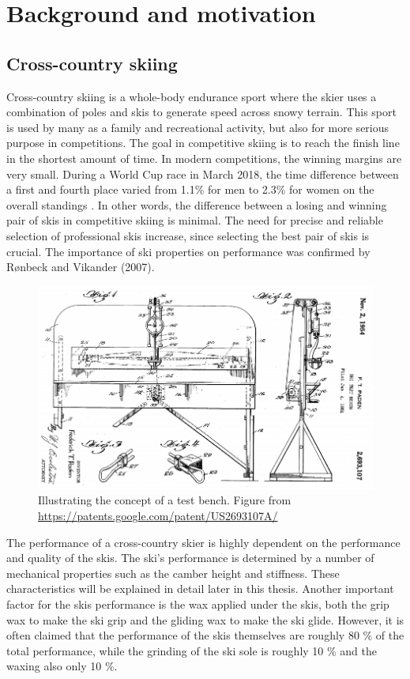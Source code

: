 \chapter{Background and motivation}
\section{Cross-country skiing}
Cross-country skiing is a whole-body endurance sport where the skier uses a combination of poles and skis to generate speed across snowy terrain. This sport is used by many as a family and recreational activity, but also for more serious purpose in competitions. The goal in competitive skiing is to reach the finish line in the shortest amount of time. In modern competitions, the winning margins are very small. During a World Cup race in March 2018, the time difference between a first and fourth place varied from 1.1\% for men to 2.3\% for women on the overall standings \citep{fis_2018}. In other words, the difference between a losing and winning pair of skis in competitive skiing is minimal. The need for precise and reliable selection of professional skis increase, since selecting the best pair of skis is crucial. The importance of ski properties on performance was confirmed by Rønbeck and Vikander (2007).

\begin{figure}
    \centering
    \includegraphics[width=1\textwidth]{figures/earlytb.png}
    \caption{Illustrating the concept of a test bench. Figure from \url{https://patents.google.com/patent/US2693107A/}}
    \label{fig:earlytb}
\end{figure}

The performance of a cross-country skier is highly dependent on the performance and quality of the skis. The ski's performance is determined by a number of mechanical properties such as the camber height and stiffness. These characteristics will be explained in detail later in this thesis. Another important factor for the skis performance is the wax applied under the skis, both the grip wax to make the ski grip and the gliding wax to make the ski glide. However, it is often claimed that the performance of the skis themselves are roughly 80 \% of the total performance, while the grinding of the ski sole is roughly 10 \% and the waxing also only 10 \%. 


